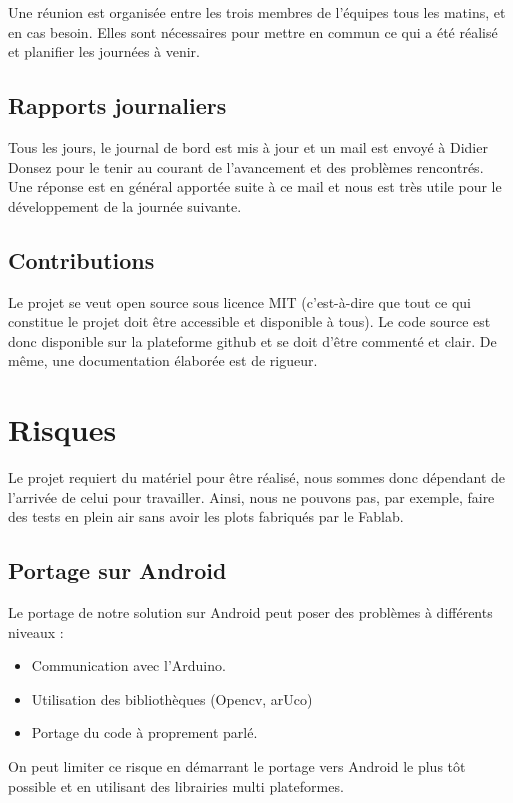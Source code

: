 \documentclass[a4paper,12pt]{article}
\begin{document}
Une réunion est organisée entre les trois membres de l'équipes tous les matins,
et en cas besoin. Elles sont nécessaires pour mettre en
commun ce qui a été réalisé et planifier les journées à venir.

\subsection{Rapports journaliers}

Tous les jours, le journal de bord est mis à jour et un mail est envoyé à
Didier Donsez pour le tenir au courant de l'avancement et des problèmes
rencontrés. Une réponse est en général apportée suite à ce mail et nous est très utile
pour le développement de la journée suivante.

\subsection{Contributions}

Le projet se veut open source sous licence MIT (c'est-à-dire que tout ce qui constitue le projet
doit être accessible et disponible à tous). Le code source est donc disponible
sur la plateforme github et se doit d'être commenté et clair. De même, une
documentation élaborée est de rigueur.

\section{Risques}

Le projet requiert du matériel pour être réalisé, nous sommes donc dépendant de l'arrivée
de celui pour travailler. Ainsi, nous ne pouvons pas, par exemple, faire des tests en
plein air sans avoir les plots fabriqués par le Fablab.

\subsection{Portage sur Android}

Le portage de notre solution sur Android peut poser des problèmes à différents
niveaux :
\begin{itemize}
    \item Communication avec l'Arduino.
    \item Utilisation des bibliothèques (Opencv, arUco)
    \item Portage du code à proprement parlé.
\end{itemize}

On peut limiter ce risque en démarrant le portage vers Android le plus tôt
possible et en utilisant des librairies multi plateformes.
\end{document}
